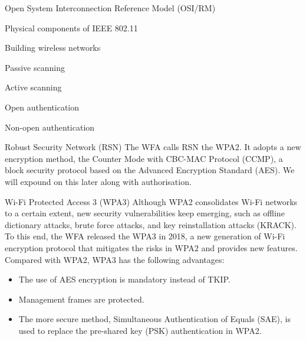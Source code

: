 \documentclass[a4paper,12pt]{book}
\begin{document}
\begin{term}{Open System Interconnection Reference Model (OSI/RM)}
\begin{term}{Physical components of IEEE 802.11}
\begin{term}{Building wireless networks}
\begin{term}{Passive scanning}
\begin{term}{Active scanning}
\begin{term}{Open authentication}
\begin{term}{Non-open authentication}
    \begin{secterm}{Robust Security Network (RSN)}
        The WFA calls RSN the WPA2. It adopts a new encryption method, the Counter Mode with CBC-MAC Protocol (CCMP), a block security protocol based on the Advanced Encryption Standard (AES). We will expound on this later along with authorisation.
    \end{secterm}

    \begin{secterm}{Wi-Fi Protected Access 3 (WPA3)}
        Although WPA2 consolidates Wi-Fi networks to a certain extent, new security vulnerabilities keep emerging, such as offline dictionary attacks, brute force attacks, and key reinstallation attacks (KRACK). To this end, the WFA released the WPA3 in 2018, a new generation of Wi-Fi encryption protocol that mitigates the risks in WPA2 and provides new features. Compared with WPA2, WPA3 has the following advantages:

        \parskip 6pt
        \begin{itemize}
            \item The use of AES encryption is mandatory instead of TKIP.
            \item Management frames are protected.
            \item The more secure method, Simultaneous Authentication of Equals (SAE), is used to replace the pre-shared key (PSK) authentication in WPA2.
            

\end{itemize}
\end{secterm}
\end{term}
\end{term}
\end{term}
\end{term}
\end{term}
\end{term}
\end{term}
\end{document}
